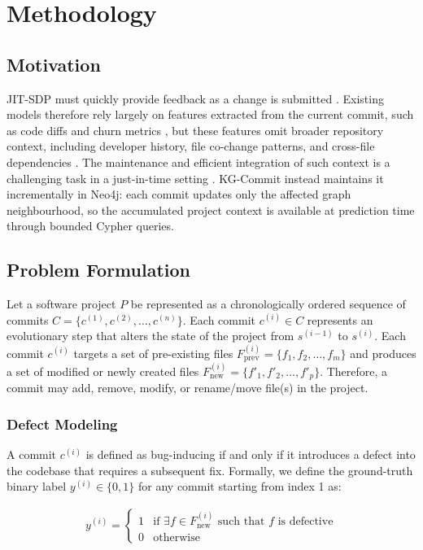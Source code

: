 \documentclass[final,5p,times,twocolumn]{elsarticle}
\theoremstyle{plain}
\begin{document}
\section{Methodology}
\label{sec:methodology}

\subsection{Motivation}
\label{sec:motivation}
JIT-SDP must quickly provide feedback as a change is submitted \cite{kamei2013large}. Existing models therefore rely largely on features extracted from the current commit, such as code diffs and churn metrics \cite{nagappan2005use}, but these features omit broader repository context, including developer history, file co-change patterns, and cross-file dependencies \cite{??,??,??}. The maintenance and efficient integration of such context is a challenging task in a just-in-time setting \cite{??,??,??}. KG-Commit instead maintains it incrementally in Neo4j: each commit updates only the affected graph neighbourhood, so the accumulated project context is available at prediction time through bounded Cypher queries.

\subsection{Problem Formulation}
\label{sec:problem_formulation}

Let a software project $P$ be represented as a chronologically ordered sequence of commits $C = \{c^{(1)}, c^{(2)}, \dots, c^{(n)}\}$. Each commit $c^{(i)} \in C$ represents an evolutionary step that alters the state of the project from $s^{(i-1)}$ to $s^{(i)}$. Each commit $c^{(i)}$ targets a set of pre-existing files $F^{(i)}_{\text{prev}} = \{f_1, f_2, \dots, f_m\}$ and produces a set of modified or newly created files $F^{(i)}_{\text{new}} = \{f'_1, f'_2, \dots, f'_p\}$. Therefore, a commit may add, remove, modify, or rename/move file(s) in the project.

\subsubsection{Defect Modeling}
\label{sec:defect-modeling}
A commit $c^{(i)}$ is defined as bug-inducing if and only if it introduces a defect into the codebase that requires a subsequent fix. Formally, we define the ground-truth binary label $y^{(i)} \in \{0, 1\}$ for any commit starting from index 1 as:

\begin{align}
y^{(i)} = \begin{cases} 1 & \text{if } \exists f \in F^{(i)}_{\text{new}} \text{ such that } f \text{ is defective} \\ 0 & \text{otherwise} \end{cases}
\end{align}
\end{document}
